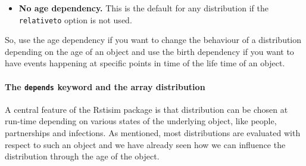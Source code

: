 \documentclass[11pt]{article}
\newenvironment{example}{\par\smallskip\noindent\begingroup\small\textbf{\small Example\enskip}}{\endgroup\par\smallskip}
\begin{document}
\begin{itemize}
\begin{example}
Specifying \texttt{at=values=1y; relativeto="birth";}
changes the behaviour. Now, the 365 days are with respect to the time of
infection (birth of the infection object). If we are 300 days after that time
the constant distribution would not return 365 but the difference relative to
the birth of the infection, so it would return 65. Coming closer to the time
point of 365 days after infection, the transition into the \emph{cleared} state
will eventually win the race against the exponential time.\footnote{Actually,
for a constant distribution as in this example, the \texttt{age} and
  \texttt{birth} variants are equivalent, but this is true \emph{only} for the
  constant distribution! An exponential distribution with
  \texttt{relativeto="age"} will always return again an exponential time,
because
  an exponential time conditioned on being bigger than, say, $x$, has again an
  exponential distribution (relative to $x$). However, an exponential
distribution
  with \texttt{relativeto="birth"} will return an exponential time minus the
  current age of the object against which it is
  evaluated, and this will eventually return a time point in the past,
  producing an error.}
  \end{example}
  
\item\textbf{No age dependency.} This is the default for any distribution if
the \texttt{relativeto} option is not used.
\end{itemize}

So, use the age dependency if you want to change the behaviour of a
distribution depending on the age of an object and use the birth dependency if
you want to have events happening at specific points in time of the life time of
an object. 

\paragraph{The  \texttt{depends} keyword and the array distribution}

A central feature of the Rstisim package is that distribution can be
chosen at run-time depending on various states of the underlying object, like
people, partnerships and infections. As mentioned, most distributions are
evaluated with respect to such an object and we have already seen how we can 
influence the distribution through the age of the object. 
\end{document}
